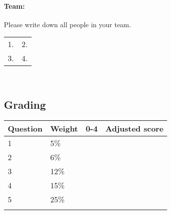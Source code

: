 \documentclass[a4paper,12pt]{book}
\begin{document}

    \newpage

    \paragraph{Team:}
    Please write down all people in your team. ~\\

    \begin{tabular}{ p{6cm} p{6cm} }
        1. & 2. \\
        3. & 4.
    \end{tabular}
    ~\\

    \hrulefill
    \subsection*{Grading}

    \begin{center}

        \begin{tabular}{ | l | l | l | l | }
            \hline
            \textbf{ Question } & \textbf{ Weight } & \textbf{ 0-4 } & \textbf{ Adjusted score }
            \\ \hline

            1 & 5\% & &    \\ \hline

            2 & 6\% & &    \\ \hline

            3 & 12\% & &    \\ \hline

            4 & 15\% & &    \\ \hline

            5 & 25\% & &    \\ \hline

            & & & \\ \hline



        \end{tabular}
    \end{center}
\end{document}
